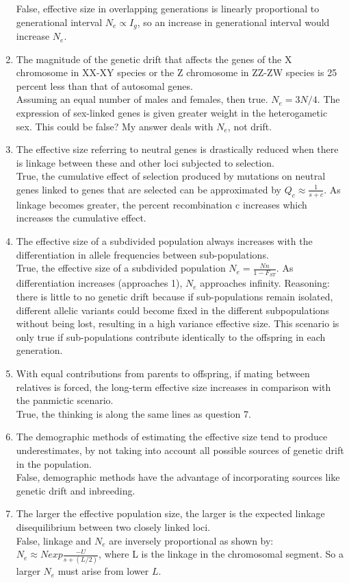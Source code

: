 \documentclass[12pt]{amsart}
\begin{document}
\begin{enumerate}
False, effective size in overlapping generations is linearly proportional to generational interval $N_e \propto I_g$, so an increase in generational interval would increase $N_e$.\\
\item The magnitude of the genetic drift that affects the genes of the X chromosome in XX-XY species or the Z chromosome in ZZ-ZW species is 25 percent less than that of autosomal genes.\\
Assuming an equal number of males and females, then true. $N_e = 3N/4$. The expression of sex-linked genes is given greater weight in the heterogametic sex. This could be false? My answer deals with $N_e$, not drift.\\
\item The effective size referring to neutral genes is drastically reduced when there is linkage between these and other loci subjected to selection.\\
True, the cumulative effect of selection produced by mutations on neutral genes linked to genes that are selected can be approximated by $Q_c \approx \frac{1}{s+c}$. As linkage becomes greater, the percent recombination c increases which increases the cumulative effect.\\
\item The effective size of a subdivided population always increases with the differentiation in allele frequencies between sub-populations.\\
True, the effective size of a subdivided population $N_e = \frac{Nn}{1-F_{ST}}$. As differentiation increases (approaches 1), $N_e$ approaches infinity. Reasoning: there is little to no genetic drift because if sub-populations remain isolated, different allelic variants could become fixed in the different subpopulations without being lost, resulting in a high variance effective size. This scenario is only true if sub-populations contribute identically to the offspring in each generation. 
\item With equal contributions from parents to offspring, if mating between relatives is forced, the long-term effective size increases in comparison with the panmictic scenario.\\
True, the thinking is along the same lines as question 7. 
\item The demographic methods of estimating the effective size tend to produce underestimates, by not taking into account all possible sources of genetic drift in the population.\\
False, demographic methods have the advantage of incorporating sources like genetic drift and inbreeding. \\
\item The larger the effective population size, the larger is the expected linkage disequilibrium between two closely linked loci.\\
False, linkage and $N_e$ are inversely proportional as shown by: $N_e \approx N exp\frac{-U}{s + (L/2)}$, where L is the linkage in the chromosomal segment. So a larger $N_e$ must arise from lower $L$.
\end{enumerate}

\medskip
\end{document}
